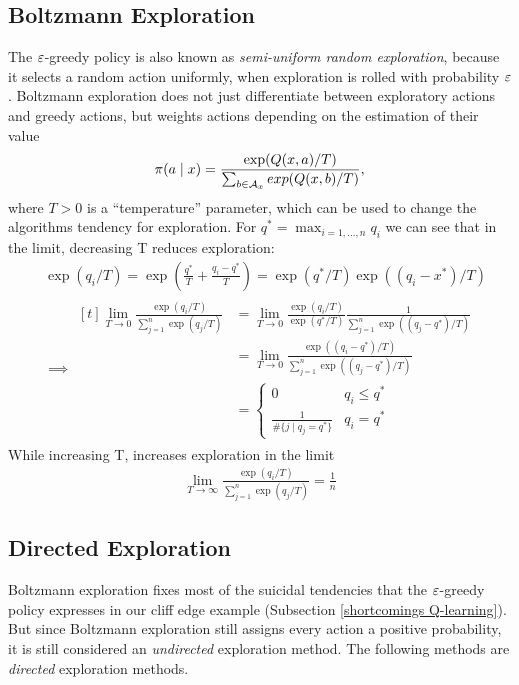 \subsection{Boltzmann Exploration}
The \(\varepsilon\)-greedy policy is also known as \emph{semi-uniform random exploration}, because it selects a random action uniformly, when exploration is rolled with probability \(\varepsilon\). Boltzmann exploration does not just differentiate between exploratory actions and greedy actions, but weights actions depending on the estimation of their value
\[
	\pi(a\mid x) = \frac{\exp(Q(x,a)/T)}{\sum_{b\in\mathcal{A}_x} exp(Q(x,b)/T)},
\]
where \(T>0\) is a ``temperature'' parameter, which can be used to change the algorithms tendency for exploration. For \(q^*=\max_{i=1,\dots,n} q_i\) we can see that in the limit, decreasing T reduces exploration:
\begin{align*}
	&\exp(q_i/T)=\exp\left(\frac{q^*}{T}+ \frac{q_i-q^*}{T}\right)= \exp(q^*/T)\exp((q_i-x^*)/T)\\
	&\implies\begin{aligned}[t]
		\lim_{T\to 0}\frac{\exp(q_i/T)}{\sum_{j=1}^n \exp(q_j/T)}
	&= \lim_{T\to 0} \frac{\exp(q_i/T)}{\exp(q^*/T)}
	\frac{1}{\sum_{j=1}^n\exp((q_j-q^*)/T)}\\
	&= \lim_{T\to 0} \frac{\exp((q_i-q^*)/T)}{\sum_{j=1}^n\exp((q_j-q^*)/T)}\\
	&=\begin{cases}
		0 & q_i \le q^*\\
		\frac{1}{\# \{j \mid  q_j=q^* \}} &q_i=q^*
	\end{cases}
	\end{aligned}
\end{align*}
While increasing T, increases exploration in the limit
\begin{align*}
	\lim_{T\to \infty}\frac{\exp(q_i/T)}{\sum_{j=1}^n \exp(q_j/T)}= \frac{1}{n}
\end{align*}


\subsection{Directed Exploration}

Boltzmann exploration fixes most of the suicidal tendencies that the \(\varepsilon\)-greedy policy expresses in our cliff edge example (Subsection \ref{shortcomings Q-learning}). But since Boltzmann exploration still assigns every action a positive probability, it is still considered an \emph{undirected} exploration method. The following methods are \emph{directed} exploration methods.

